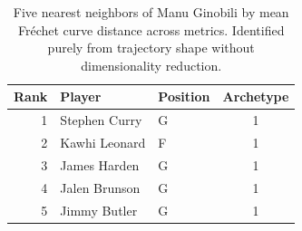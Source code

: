 \begin{table}[htbp]
  \centering\small
  \begin{tabular}{rllc}
    \toprule
    Rank & Player & Position & Archetype \\
    \midrule
    1 & Stephen Curry & G & 1 \\
    2 & Kawhi Leonard & F & 1 \\
    3 & James Harden & G & 1 \\
    4 & Jalen Brunson & G & 1 \\
    5 & Jimmy Butler & G & 1 \\
    \bottomrule
  \end{tabular}
  \caption{Five nearest neighbors of Manu Ginobili by mean Fr\'{e}chet curve distance across metrics. Identified purely from trajectory shape without dimensionality reduction.}
  \label{tab:Manu_Ginobili_frechet_curve_neighbors}
\end{table}

